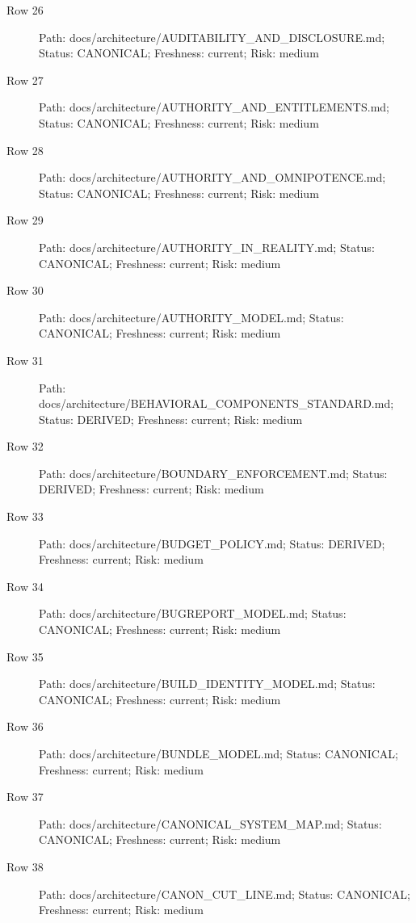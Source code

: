 \documentclass[10.5pt,a4paper,openany]{book}
\begin{document}
\begin{description}
\item[Row 26] Path: docs/\allowbreak{}architecture/\allowbreak{}AUDITABILITY\_\allowbreak{}AND\_\allowbreak{}DISCLOSURE.\allowbreak{}md; Status: CANONICAL; Freshness: current; Risk: medium
\item[Row 27] Path: docs/\allowbreak{}architecture/\allowbreak{}AUTHORITY\_\allowbreak{}AND\_\allowbreak{}ENTITLEMENTS.\allowbreak{}md; Status: CANONICAL; Freshness: current; Risk: medium
\item[Row 28] Path: docs/\allowbreak{}architecture/\allowbreak{}AUTHORITY\_\allowbreak{}AND\_\allowbreak{}OMNIPOTENCE.\allowbreak{}md; Status: CANONICAL; Freshness: current; Risk: medium
\item[Row 29] Path: docs/\allowbreak{}architecture/\allowbreak{}AUTHORITY\_\allowbreak{}IN\_\allowbreak{}REALITY.\allowbreak{}md; Status: CANONICAL; Freshness: current; Risk: medium
\item[Row 30] Path: docs/\allowbreak{}architecture/\allowbreak{}AUTHORITY\_\allowbreak{}MODEL.\allowbreak{}md; Status: CANONICAL; Freshness: current; Risk: medium
\item[Row 31] Path: docs/\allowbreak{}architecture/\allowbreak{}BEHAVIORAL\_\allowbreak{}COMPONENTS\_\allowbreak{}STANDARD.\allowbreak{}md; Status: DERIVED; Freshness: current; Risk: medium
\item[Row 32] Path: docs/\allowbreak{}architecture/\allowbreak{}BOUNDARY\_\allowbreak{}ENFORCEMENT.\allowbreak{}md; Status: DERIVED; Freshness: current; Risk: medium
\item[Row 33] Path: docs/\allowbreak{}architecture/\allowbreak{}BUDGET\_\allowbreak{}POLICY.\allowbreak{}md; Status: DERIVED; Freshness: current; Risk: medium
\item[Row 34] Path: docs/\allowbreak{}architecture/\allowbreak{}BUGREPORT\_\allowbreak{}MODEL.\allowbreak{}md; Status: CANONICAL; Freshness: current; Risk: medium
\item[Row 35] Path: docs/\allowbreak{}architecture/\allowbreak{}BUILD\_\allowbreak{}IDENTITY\_\allowbreak{}MODEL.\allowbreak{}md; Status: CANONICAL; Freshness: current; Risk: medium
\item[Row 36] Path: docs/\allowbreak{}architecture/\allowbreak{}BUNDLE\_\allowbreak{}MODEL.\allowbreak{}md; Status: CANONICAL; Freshness: current; Risk: medium
\item[Row 37] Path: docs/\allowbreak{}architecture/\allowbreak{}CANONICAL\_\allowbreak{}SYSTEM\_\allowbreak{}MAP.\allowbreak{}md; Status: CANONICAL; Freshness: current; Risk: medium
\item[Row 38] Path: docs/\allowbreak{}architecture/\allowbreak{}CANON\_\allowbreak{}CUT\_\allowbreak{}LINE.\allowbreak{}md; Status: CANONICAL; Freshness: current; Risk: medium

\end{description}
\end{document}

